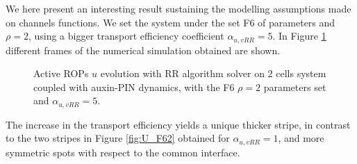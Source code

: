 We here present an interesting result sustaining the modelling assumptions made on channels functions. We set the system under the set F6 of parameters and $\rho = 2$, using a bigger transport efficiency coefficient $\alpha_{u,vRR} = 5$. In Figure \ref{fig:U_alpha5} different frames of the numerical simulation obtained are shown.
 \begin{figure}[H]
     \centering
     \quad
     \quad
     \quad
     \quad
     \quad
     \quad
     \quad
     \quad
     \caption[2cell RR Active ROPs coupled auxin-PIN - with the F6 $\rho = 2$ set and and $\alpha_{u,vRR} = 5$]{Active ROPs $u$ evolution with RR algorithm solver on 2 cells system coupled with auxin-PIN dynamics, with the F6 $\rho = 2$ parameters set and $\alpha_{u,vRR} = 5$.}
     \label{fig:U_alpha5}
 \end{figure}
The increase in the transport efficiency yields a unique thicker stripe, in contrast to the two stripes in Figure \ref{fig:U_F62} obtained for $\alpha_{u,vRR} = 1$, and more symmetric spots with respect to the common interface.

